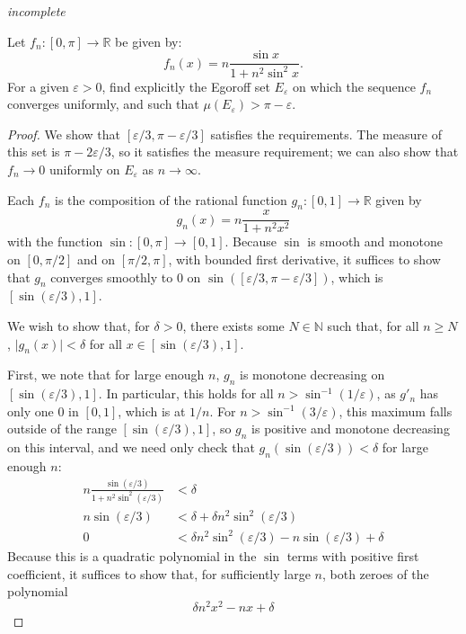 \documentclass[12pt]{article}
\newcommand{\N}{\mathbb{N}}
\newcommand{\R}{\mathbb{R}}
\theoremstyle{definition}
\newenvironment{problem}[2][Problem]{\begin{trivlist}
\item[\hskip \labelsep {\bfseries #1}\hskip \labelsep {\bfseries #2.}]}{\end{trivlist}}
\begin{document}
\begin{problem}{3}
	\textit{incomplete}	
\end{problem}
\begin{problem}{4}
	Let $f_n: [0, \pi] \to \R$ be given by:	
	\[ f_n(x) = n \frac{\sin x}{1 + n^2 \sin^2 x}.\]
	For a given $\varepsilon > 0$, find explicitly the Egoroff set $E_\varepsilon$ on which the sequence $f_n$ converges uniformly, and such that $\mu(E_\varepsilon) > \pi - \varepsilon$.
	\begin{proof}
		We show that $[\varepsilon/3, \pi - \varepsilon/3]$ satisfies the requirements. The measure of this set is $\pi - 2\varepsilon/3$, so it satisfies the measure requirement; we can also show that $f_n \to 0$ uniformly on $E_\varepsilon$ as $n \to \infty$.
		\par Each $f_n$ is the composition of the rational function $g_n : [0,1] \to \R$ given by
		\[g_n(x) = n\frac{x}{1 + n^2x^2}\]
		with the function $\sin: [0,\pi] \to [0,1]$. Because $\sin$ is smooth and monotone on $[0,\pi/2]$ and on $[\pi/2, \pi]$, with bounded first derivative, it suffices to show that $g_n$ converges smoothly to $0$ on $\sin([\varepsilon/3, \pi - \varepsilon/3])$, which is $[\sin(\varepsilon/3), 1]$. 
		\par We wish to show that, for $\delta > 0$, there exists some $N \in \N$ such that, for all $n \geq N$, $\lvert g_n(x)\rvert < \delta$ for all $x \in [\sin(\varepsilon/3), 1]$. 
		\par First, we note that for large enough $n$, $g_n$ is monotone decreasing on $[\sin(\varepsilon/3), 1]$. In particular, this holds for all $n > \sin^{-1}(1/\varepsilon)$, as $g'_n$ has only one $0$ in $[0,1]$, which is at $1/n$. For $n > \sin^{-1}(3/\varepsilon)$, this maximum falls outside of the range $[\sin(\varepsilon/3), 1]$, so $g_n$ is positive and monotone decreasing on this interval, and we need only check that $g_n(\sin(\varepsilon/3)) < \delta$ for large enough $n$:
		\begin{align*}
			 n\frac{\sin(\varepsilon/3)}{1 + n^2\sin^2 (\varepsilon/3)} &< \delta\\
			 n\sin(\varepsilon/3) &< \delta + \delta n^2 \sin^2(\varepsilon/3)\\
			 0 &< \delta n^2 \sin^2(\varepsilon/3) - n\sin(\varepsilon/3) + \delta
		\end{align*}
		Because this is a quadratic polynomial in the $\sin$ terms with positive first coefficient, it suffices to show that, for sufficiently large $n$, both zeroes of the polynomial 
		\[\delta n^2 x^2 - nx + \delta\]

\end{proof}
\end{problem}
\end{document}
